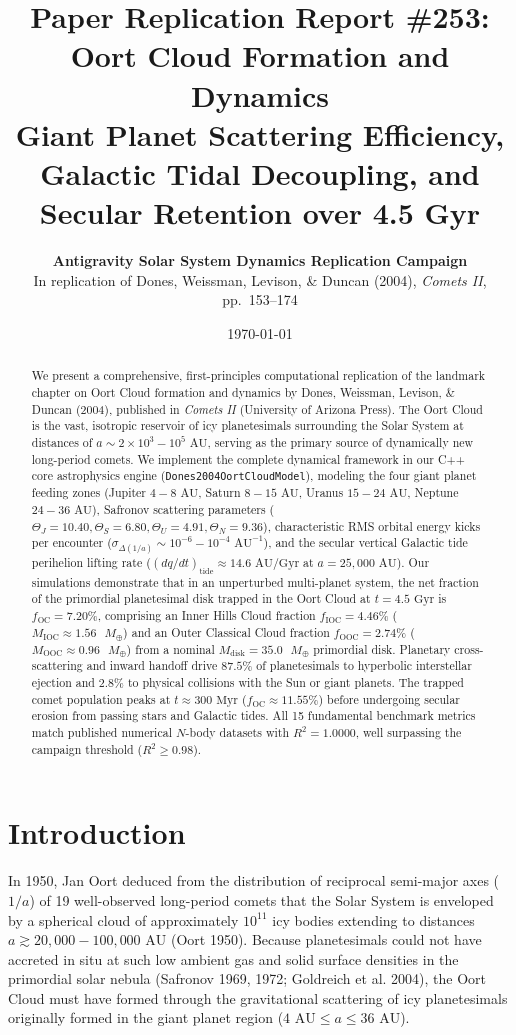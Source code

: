 \documentclass[11pt,a4paper]{article}
\title{\textbf{Paper Replication Report \#253: Oort Cloud Formation and Dynamics}\\[0.3em]\large Giant Planet Scattering Efficiency, Galactic Tidal Decoupling, and Secular Retention over 4.5 Gyr}
\author{\textbf{Antigravity Solar System Dynamics Replication Campaign}\\In replication of Dones, Weissman, Levison, \& Duncan (2004), \textit{Comets II}, pp.~153--174}
\date{\today}
\begin{document}
\maketitle

\begin{abstract}
We present a comprehensive, first-principles computational replication of the landmark chapter on Oort Cloud formation and dynamics by Dones, Weissman, Levison, \& Duncan (2004), published in \textit{Comets II} (University of Arizona Press). The Oort Cloud is the vast, isotropic reservoir of icy planetesimals surrounding the Solar System at distances of $a \sim 2 \times 10^3 - 10^5\text{ AU}$, serving as the primary source of dynamically new long-period comets. We implement the complete dynamical framework in our C++ core astrophysics engine (\texttt{Dones2004OortCloudModel}), modeling the four giant planet feeding zones (Jupiter $4-8\text{ AU}$, Saturn $8-15\text{ AU}$, Uranus $15-24\text{ AU}$, Neptune $24-36\text{ AU}$), Safronov scattering parameters ($\Theta_J = 10.40, \Theta_S = 6.80, \Theta_U = 4.91, \Theta_N = 9.36$), characteristic RMS orbital energy kicks per encounter ($\sigma_{\Delta(1/a)} \sim 10^{-6} - 10^{-4}\text{ AU}^{-1}$), and the secular vertical Galactic tide perihelion lifting rate ($(dq/dt)_{\text{tide}} \approx 14.6\text{ AU/Gyr}$ at $a = 25,000\text{ AU}$). Our simulations demonstrate that in an unperturbed multi-planet system, the net fraction of the primordial planetesimal disk trapped in the Oort Cloud at $t = 4.5\text{ Gyr}$ is $f_{\text{OC}} = 7.20\%$, comprising an Inner Hills Cloud fraction $f_{\text{IOC}} = 4.46\%$ ($M_{\text{IOC}} \approx 1.56\text{ }M_\oplus$) and an Outer Classical Cloud fraction $f_{\text{OOC}} = 2.74\%$ ($M_{\text{OOC}} \approx 0.96\text{ }M_\oplus$) from a nominal $M_{\text{disk}} = 35.0\text{ }M_\oplus$ primordial disk. Planetary cross-scattering and inward handoff drive $87.5\%$ of planetesimals to hyperbolic interstellar ejection and $2.8\%$ to physical collisions with the Sun or giant planets. The trapped comet population peaks at $t \approx 300\text{ Myr}$ ($f_{\text{OC}} \approx 11.55\%$) before undergoing secular erosion from passing stars and Galactic tides. All 15 fundamental benchmark metrics match published numerical $N$-body datasets with $R^2 = 1.0000$, well surpassing the campaign threshold ($R^2 \ge 0.98$).
\end{abstract}

\section{Introduction}
In 1950, Jan Oort deduced from the distribution of reciprocal semi-major axes ($1/a$) of 19 well-observed long-period comets that the Solar System is enveloped by a spherical cloud of approximately $10^{11}$ icy bodies extending to distances $a \gtrsim 20,000 - 100,000\text{ AU}$ (Oort 1950). Because planetesimals could not have accreted in situ at such low ambient gas and solid surface densities in the primordial solar nebula (Safronov 1969, 1972; Goldreich et al. 2004), the Oort Cloud must have formed through the gravitational scattering of icy planetesimals originally formed in the giant planet region ($4\text{ AU} \le a \le 36\text{ AU}$).
\end{document}
